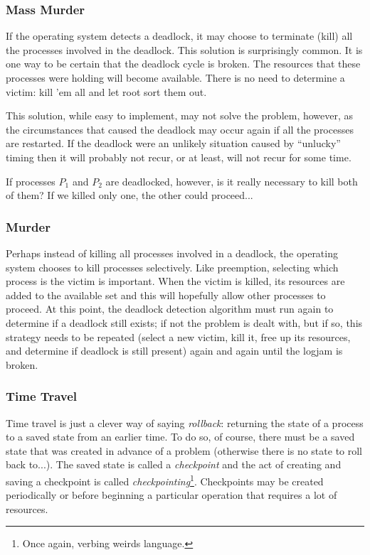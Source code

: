 \subsubsection*{Mass Murder}
If the operating system detects a deadlock, it may choose to terminate (kill) all the processes involved in the deadlock. This solution is surprisingly common. It is one way to be certain that the deadlock cycle is broken. The resources that these processes were holding will become available. There is no need to determine a victim: kill 'em all and let root sort them out.

This solution, while easy to implement, may not solve the problem, however, as the circumstances that caused the deadlock may occur again if all the processes are restarted. If the deadlock were an unlikely situation caused by ``unlucky'' timing then it will probably not recur, or at least, will not recur for some time.

If processes $P_{1}$ and $P_{2}$ are deadlocked, however, is it really necessary to kill both of them? If we killed only one, the other could proceed...

\subsubsection*{Murder}
Perhaps instead of killing all processes involved in a deadlock, the operating system chooses to kill processes selectively. Like preemption, selecting which process is the victim is important. When the victim is killed, its resources are added to the available set and this will hopefully allow other processes to proceed. At this point, the deadlock detection algorithm must run again to determine if a deadlock still exists; if not the problem is dealt with, but if so, this strategy needs to be repeated (select a new victim, kill it, free up its resources, and determine if deadlock is still present) again and again until the logjam is broken.



\subsubsection*{Time Travel}
Time travel is just a clever way of saying \textit{rollback}: returning the state of a process to a saved state from an earlier time. To do so, of course, there must be a saved state that was created in advance of a problem (otherwise there is no state to roll back to...). The saved state is called a \textit{checkpoint} and the act of creating and saving a checkpoint is called \textit{checkpointing}\footnote{Once again, verbing weirds language.}. Checkpoints may be created periodically or before beginning a particular operation that requires a lot of resources.

